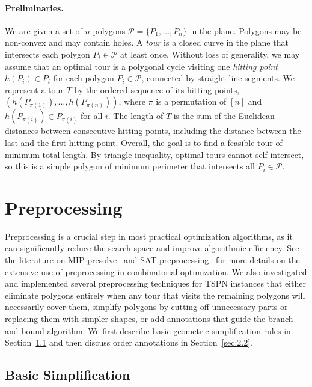 \documentclass[11pt,a4paper]{article}
\theoremstyle{plain}
\begin{document}
\paragraph{Preliminaries.} We are given a set of $n$ polygons $\mathcal{P} = \{P_1, \dots, P_n\}$ in the plane. Polygons may be non-convex and may contain holes. A \emph{tour} is a closed curve in the plane that intersects each polygon $P_i \in \mathcal{P}$ at least once. Without loss of generality, we may assume that an optimal tour is a polygonal cycle visiting one \emph{hitting point} $h(P_i) \in P_i$ for each polygon $P_i \in \mathcal{P}$, connected by straight-line segments. We represent a tour $T$ by the ordered sequence of its hitting points, $(h(P_{\pi(1)}), \dots, h(P_{\pi(n)}))$, where $\pi$ is a permutation of $[n]$ and $h(P_{\pi(i)}) \in P_{\pi(i)}$ for all $i$. The length of $T$ is the sum of the Euclidean distances between consecutive hitting points, including the distance between the last and the first hitting point. Overall, the goal is to find a feasible tour of minimum total length. By triangle inequality, optimal tours cannot self-intersect, so this is a simple polygon of minimum perimeter that intersects all $P_i \in \mathcal{P}$.

\section{Preprocessing}

Preprocessing is a crucial step in most practical optimization algorithms, as it can significantly reduce the search space and improve algorithmic efficiency. See the literature on MIP presolve~\cite{ref1} and SAT preprocessing~\cite{ref7} for more details on the extensive use of preprocessing in combinatorial optimization. We also investigated and implemented several preprocessing techniques for TSPN instances that either eliminate polygons entirely when any tour that visits the remaining polygons will necessarily cover them, simplify polygons by cutting off unnecessary parts or replacing them with simpler shapes, or add annotations that guide the branch-and-bound algorithm. We first describe basic geometric simplification rules in Section~\ref{sec:2.1} and then discuss order annotations in Section~\ref{sec:2.2}.

\subsection{Basic Simplification}
\label{sec:2.1}
\end{document}
